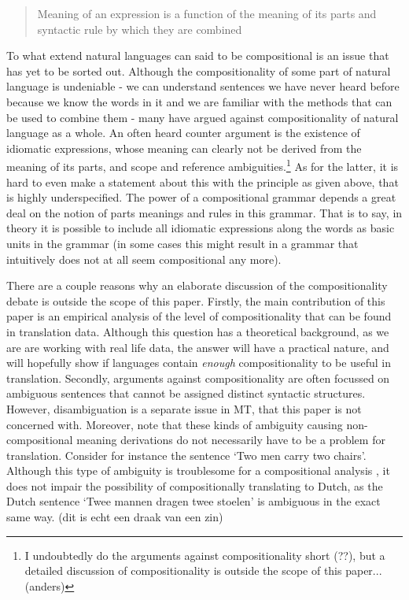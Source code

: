 \documentclass{report}
\theoremstyle{definition}
\theoremstyle{plain}
\begin{document}
\begin{quote}
Meaning of an expression is a function of the meaning of its parts and syntactic rule by which they are combined \cite{partee1984compositionality}
\end{quote}

To what extend natural languages can said to be compositional is an issue that has yet to be sorted out. Although the compositionality of some part of natural language is undeniable - we can understand sentences we have never heard before because we know the words in it and we are familiar with the methods that can be used to combine them - many have argued against compositionality of natural language as a whole. An often heard counter argument is the existence of idiomatic expressions, whose meaning can clearly not be derived from the meaning of its parts, and scope and reference ambiguities.\footnote{I undoubtedly do the arguments against compositionality short (??), but a detailed discussion of compositionality is outside the scope of this paper... (anders)} As for the latter, it is hard to even make a statement about this with the principle as given above, that is highly underspecified. The power of a compositional grammar depends a great deal on the notion of parts meanings and rules in this grammar. That is to say, in theory it is possible to include all idiomatic expressions along the words as basic units in the grammar (in some cases this might result in a grammar that intuitively does not at all seem compositional any more). 

There are a couple reasons why an elaborate discussion of the compositionality debate is outside the scope of this paper. Firstly, the main contribution of this paper is an empirical analysis of the level of compositionality that can be found in translation data. Although this question has a theoretical background, as we are are working with real life data, the answer will have a practical nature, and will hopefully show if languages contain \textit{enough} compositionality to be useful in translation. Secondly, arguments against compositionality are often focussed on ambiguous sentences that cannot be assigned distinct syntactic structures. However, disambiguation is a separate issue in MT, that this paper is not concerned with. Moreover, note that these kinds of ambiguity causing non-compositional meaning derivations do not necessarily have to be a problem for translation. Consider for instance the sentence `Two men carry two chairs'. Although this type of ambiguity is troublesome for a compositional analysis \citep{pelletier1994principle}, it does not impair the possibility of compositionally translating to Dutch, as the Dutch sentence `Twee mannen dragen twee stoelen' is ambiguous in the exact same way. (dit is echt een draak van een zin)
\end{document}
